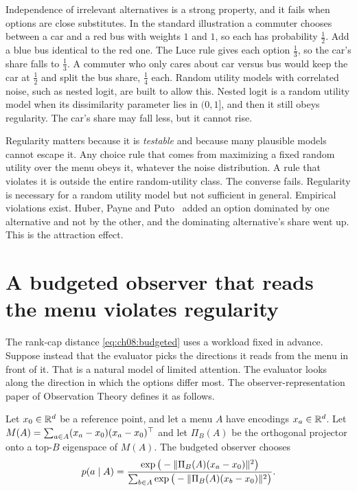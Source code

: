 Independence of irrelevant alternatives is a strong property, and it fails when options are close substitutes. In the standard illustration a commuter chooses between a car and a red bus with weights $1$ and $1$, so each has probability $\tfrac12$. Add a blue bus identical to the red one. The Luce rule gives each option $\tfrac13$, so the car's share falls to $\tfrac13$. A commuter who only cares about car versus bus would keep the car at $\tfrac12$ and split the bus share, $\tfrac14$ each. Random utility models with correlated noise, such as nested logit, are built to allow this. Nested logit is a random utility model when its dissimilarity parameter lies in $(0,1]$, and then it still obeys regularity. The car's share may fall less, but it cannot rise.

Regularity matters because it is \emph{testable} and because many plausible models cannot escape it. Any choice rule that comes from maximizing a fixed random utility over the menu obeys it, whatever the noise distribution. A rule that violates it is outside the entire random-utility class. The converse fails. Regularity is necessary for a random utility model but not sufficient in general. Empirical violations exist. Huber, Payne and Puto~\cite{huber1982} added an option dominated by one alternative and not by the other, and the dominating alternative's share went up. This is the attraction effect.


\section{A budgeted observer that reads the menu violates regularity}\label{sec:ch08:budget}

The rank-cap distance \eqref{eq:ch08:budgeted} uses a workload fixed in advance. Suppose instead that the evaluator picks the directions it reads from the menu in front of it. That is a natural model of limited attention. The evaluator looks along the direction in which the options differ most. The observer-representation paper of Observation Theory defines it as follows.

\begin{definition}\label{def:ch08:budgeted}
Let $x_0\in\mathbb{R}^d$ be a reference point, and let a menu $A$ have encodings $x_a\in\mathbb{R}^d$. Let $M(A)=\sum_{a\in A}(x_a-x_0)(x_a-x_0)^{\top}$ and let $\Pi_B(A)$ be the orthogonal projector onto a top-$B$ eigenspace of $M(A)$. The budgeted observer chooses
\begin{equation}\label{eq:ch08:budgetedchoice}
p(a\mid A)=\frac{\exp\big(-\lVert \Pi_B(A)(x_a-x_0)\rVert^2\big)}{\sum_{b\in A}\exp\big(-\lVert \Pi_B(A)(x_b-x_0)\rVert^2\big)}.
\end{equation}
\end{definition}


